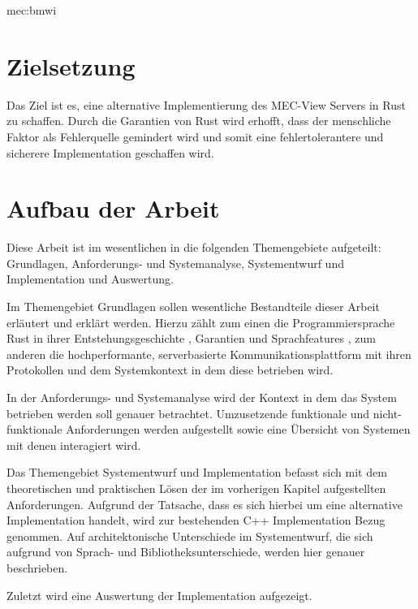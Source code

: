 \gls{mec:bmwi}

\section{Zielsetzung}

Das Ziel ist es, eine alternative Implementierung des MEC-View Servers in Rust zu schaffen.
Durch die Garantien  von Rust wird erhofft, dass der menschliche Faktor als Fehlerquelle gemindert wird und somit eine fehlertolerantere und sicherere Implementation geschaffen wird.


\section{Aufbau der Arbeit}

Diese Arbeit ist im wesentlichen in die folgenden Themengebiete aufgeteilt: Grundlagen, Anforderungs- und Systemanalyse, Systementwurf und Implementation und Auswertung.

Im Themengebiet Grundlagen sollen wesentliche Bestandteile dieser Arbeit erläutert und erklärt werden.
Hierzu zählt zum einen die Programmiersprache Rust in ihrer Entstehungsgeschichte , Garantien   und Sprachfeatures , zum anderen die hochperformante, serverbasierte Kommunikationsplattform mit ihren Protokollen  und dem Systemkontext in dem diese betrieben wird.

In der Anforderungs- und Systemanalyse wird der Kontext in dem das System betrieben werden soll genauer betrachtet. Umzusetzende funktionale und nicht-funktionale Anforderungen werden aufgestellt sowie eine Übersicht von Systemen mit denen interagiert wird.

Das Themengebiet Systementwurf und Implementation befasst sich mit dem theoretischen und praktischen Lösen der im vorherigen Kapitel aufgestellten Anforderungen. Aufgrund der Tatsache, dass es sich hierbei
um eine alternative Implementation handelt, wird zur bestehenden C++ Implementation Bezug genommen.
Auf architektonische Unterschiede im Systementwurf, die sich aufgrund von Sprach- und Bibliotheksunterschiede, werden hier genauer beschrieben.

Zuletzt wird eine Auswertung der Implementation aufgezeigt. 